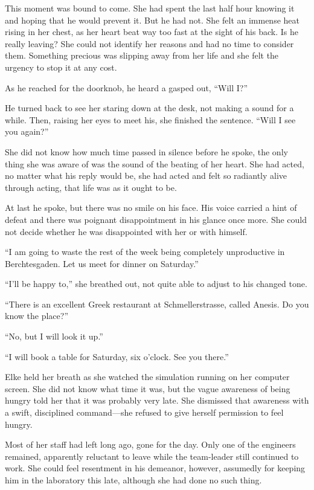 This moment was bound to come. She had spent the last half hour knowing it and hoping that he would prevent it. But he had not. She felt an immense heat rising in her chest, as her heart beat way too fast at the sight of his back. Is he really leaving? She could not identify her reasons and had no time to consider them. Something precious was slipping away from her life and she felt the urgency to stop it at any cost.

As he reached for the doorknob, he heard a gasped out, ``Will I?''

He turned back to see her staring down at the desk, not making a sound for a while. Then, raising her eyes to meet his, she finished the sentence. ``Will I see you again?''

She did not know how much time passed in silence before he spoke, the only thing she was aware of was the sound of the beating of her heart. She had acted, no matter what his reply would be, she had acted and felt so radiantly alive through acting, that life was as it ought to be.

At last he spoke, but there was no smile on his face. His voice carried a hint of defeat and there was poignant disappointment in his glance once more. She could not decide whether he was disappointed with her or with himself.

``I am going to waste the rest of the week being completely unproductive in Berchtesgaden. Let us meet for dinner on Saturday.''

``I'll be happy to,'' she breathed out, not quite able to adjust to his changed tone.

``There is an excellent Greek restaurant at Schmellerstrasse, called Anesis. Do you know the place?''

``No, but I will look it up.''

``I will book a table for Saturday, six o'clock. See you there.''

\sectionline

Elke held her breath as she watched the simulation running on her computer screen. She did not know what time it was, but the vague awareness of being hungry told her that it was probably very late. She dismissed that awareness with a swift, disciplined command---she refused to give herself permission to feel hungry.

Most of her staff had left long ago, gone for the day. Only one of the engineers remained, apparently reluctant to leave while the team-leader still continued to work. She could feel resentment in his demeanor, however, assumedly for keeping him in the laboratory this late, although she had done no such thing.

